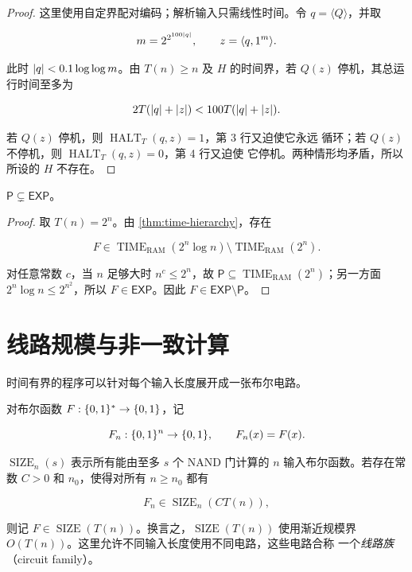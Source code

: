 \begin{proof}
  这里使用自定界配对编码；解析输入只需线性时间。令 $q=\langle Q\rangle$，并取

  \[
    m=2^{2^{100\lvert q\rvert}},
    \qquad
    z=\langle q,1^m\rangle.
  \]

  此时 $\lvert q\rvert<0.1\log\log m$。由 $T(n)\geq n$ 及 $H$ 的时间界，若
  $Q(z)$ 停机，其总运行时间至多为

  \[
    2T(\lvert q\rvert+\lvert z\rvert)
      <100T(\lvert q\rvert+\lvert z\rvert).
  \]

  若 $Q(z)$ 停机，则 $\operatorname{HALT}_T(q,z)=1$，第 3 行又迫使它永远
  循环；若 $Q(z)$ 不停机，则 $\operatorname{HALT}_T(q,z)=0$，第 4 行又迫使
  它停机。两种情形均矛盾，所以所设的 $H$ 不存在。
\end{proof}

\begin{corollary}
  \label{cor:p-strict-exp}
  $\mathsf P\subsetneq\mathsf{EXP}$。
\end{corollary}

\begin{proof}
  取 $T(n)=2^n$。由 \cref{thm:time-hierarchy}，存在

  \[
    F\in\operatorname{TIME}_{\mathrm{RAM}}(2^n\log n)
      \setminus\operatorname{TIME}_{\mathrm{RAM}}(2^n).
  \]

  对任意常数 $c$，当 $n$ 足够大时 $n^c\leq 2^n$，故
  $\mathsf P\subseteq\operatorname{TIME}_{\mathrm{RAM}}(2^n)$；另一方面
  $2^n\log n\leq 2^{n^2}$，所以 $F\in\mathsf{EXP}$。因此
  $F\in\mathsf{EXP}\setminus\mathsf P$。
\end{proof}

\section{线路规模与非一致计算}

时间有界的程序可以针对每个输入长度展开成一张布尔电路。

\begin{definition}[线路规模类]
  \label{def:circuit-size-class}
  对布尔函数 $F:\{0,1\}^{*}\to\{0,1\}$，记

  \[
    F_n:\{0,1\}^n\to\{0,1\},
    \qquad
    F_n(x)=F(x).
  \]

  $\operatorname{SIZE}_n(s)$ 表示所有能由至多 $s$ 个 NAND 门计算的
  $n$ 输入布尔函数。若存在常数 $C>0$ 和 $n_0$，使得对所有 $n\geq n_0$ 都有

  \[
    F_n\in\operatorname{SIZE}_n(C T(n)),
  \]

  则记 $F\in\operatorname{SIZE}(T(n))$。换言之，$\operatorname{SIZE}(T(n))$
  使用渐近规模界 $O(T(n))$。这里允许不同输入长度使用不同电路，这些电路合称
  一个\emph{线路族}（circuit family）。
\end{definition}

